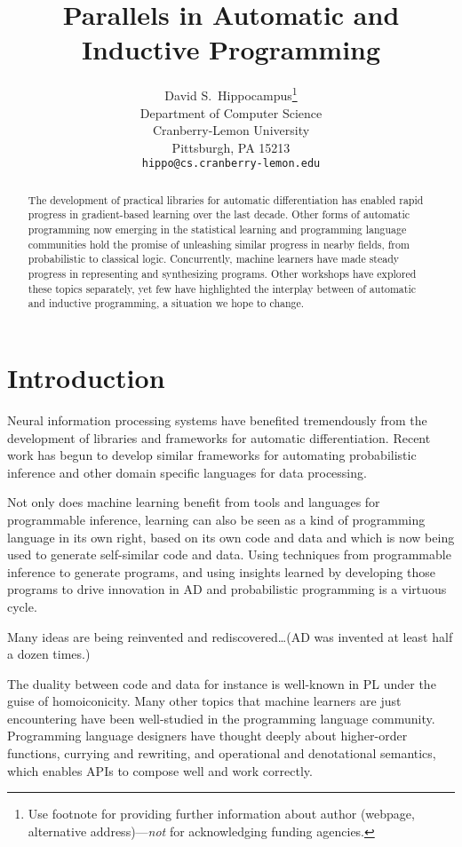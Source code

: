 \documentclass{article}
\title{Parallels in Automatic and Inductive Programming}
\author{%
    David S.~Hippocampus\thanks{Use footnote for providing further information
    about author (webpage, alternative address)---\emph{not} for acknowledging
    funding agencies.} \\
    Department of Computer Science\\
    Cranberry-Lemon University\\
    Pittsburgh, PA 15213 \\
    \texttt{hippo@cs.cranberry-lemon.edu} \\
}
\begin{document}
    \maketitle

    \begin{abstract}
        The development of practical libraries for automatic differentiation has enabled rapid progress in gradient-based learning over the last decade. Other forms of automatic programming now emerging in the statistical learning and programming language communities hold the promise of unleashing similar progress in nearby fields, from probabilistic to classical logic. Concurrently, machine learners have made steady progress in representing and synthesizing programs. Other workshops have explored these topics separately, yet few have highlighted the interplay between of automatic and inductive programming, a situation we hope to change.
    \end{abstract}

    \section{Introduction}

    Neural information processing systems have benefited tremendously from the development of libraries and frameworks for automatic differentiation. Recent work has begun to develop similar frameworks for automating probabilistic inference and other domain specific languages for data processing.

    Not only does machine learning benefit from tools and languages for programmable inference, learning can also be seen as a kind of programming language in its own right, based on its own code and data and which is now being used to generate self-similar code and data. Using techniques from programmable inference to generate programs, and using insights learned by developing those programs to drive innovation in AD and probabilistic programming is a virtuous cycle.

    Many ideas are being reinvented and rediscovered\ldots (AD was invented at least half a dozen times.)

    The duality between code and data for instance is well-known in PL under the guise of homoiconicity. Many other topics that machine learners are just encountering have been well-studied in the programming language community. Programming language designers have thought deeply about higher-order functions, currying and rewriting, and operational and denotational semantics, which enables APIs to compose well and work correctly.
\end{document}
